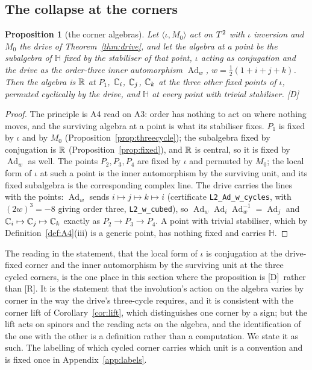 \documentclass[11pt,a4paper]{article}
\theoremstyle{plain}
\newtheorem{proposition}[theorem]{Proposition}
\theoremstyle{definition}
\theoremstyle{remark}
\newcommand{\Hquat}{\mathbb{H}}
\newcommand{\Ad}{\operatorname{Ad}}
\newcommand{\rigR}{[\textup{R}]}
\newcommand{\rigD}{[\textup{D}]}
\begin{document}
\subsection{The collapse at the corners}

\begin{proposition}[the corner algebras]\label{prop:collapse}
Let $\langle\iota,M_{0}\rangle$ act on $T^2$ with $\iota$ inversion and $M_{0}$ the drive of Theorem~\ref{thm:drive}, and let the algebra at a point be the subalgebra of $\Hquat$ fixed by the stabiliser of that point, $\iota$ acting as conjugation and the drive as the order-three inner automorphism $\Ad_{w}$, $w=\tfrac12(1+i+j+k)$. Then the algebra is $\mathbb{R}$ at $P_{1}$, $\mathbb{C}_{i}$, $\mathbb{C}_{j}$, $\mathbb{C}_{k}$ at the three other fixed points of $\iota$, permuted cyclically by the drive, and $\Hquat$ at every point with trivial stabiliser. \rigD
\end{proposition}

\begin{proof}
The principle is A4 read on A3: order has nothing to act on where nothing moves, and the surviving algebra at a point is what its stabiliser fixes. $P_{1}$ is fixed by $\iota$ and by $M_{0}$ (Proposition~\ref{prop:threecycle}); the subalgebra fixed by conjugation is $\mathbb{R}$ (Proposition~\ref{prop:fixed}), and $\mathbb{R}$ is central, so it is fixed by $\Ad_{w}$ as well. The points $P_{2},P_{3},P_{4}$ are fixed by $\iota$ and permuted by $M_{0}$; the local form of $\iota$ at such a point is the inner automorphism by the surviving unit, and its fixed subalgebra is the corresponding complex line. The drive carries the lines with the points: $\Ad_{w}$ sends $i\mapsto j\mapsto k\mapsto i$ (certificate \texttt{L2\_Ad\_w\_cycles}, with $(2w)^{3}=-8$ giving order three, \texttt{L2\_w\_cubed}), so $\Ad_{w}\Ad_{i}\Ad_{w}^{-1}=\Ad_{j}$ and $\mathbb{C}_{i}\mapsto\mathbb{C}_{j}\mapsto\mathbb{C}_{k}$ exactly as $P_{2}\to P_{3}\to P_{4}$. A point with trivial stabiliser, which by Definition~\ref{def:A4}(iii) is a generic point, has nothing fixed and carries $\Hquat$.
\end{proof}

The reading in the statement, that the local form of $\iota$ is conjugation at the drive-fixed corner and the inner automorphism by the surviving unit at the three cycled corners, is the one place in this section where the proposition is \rigD\ rather than \rigR. It is the statement that the involution's action on the algebra varies by corner in the way the drive's three-cycle requires, and it is consistent with the corner lift of Corollary~\ref{cor:lift}, which distinguishes one corner by a sign; but the lift acts on spinors and the reading acts on the algebra, and the identification of the one with the other is a definition rather than a computation. We state it as such. The labelling of which cycled corner carries which unit is a convention and is fixed once in Appendix~\ref{app:labels}.
\end{document}
